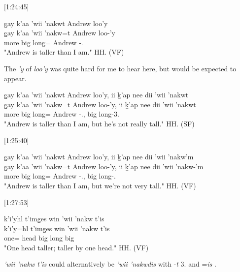 [1:24:45]
\begin{exe}
    \ex \glll
    g̱ay k’aa ’wii ’nakwt Andrew loo'y \\
    g̱ay k’aa ’wii ’nakw=t Andrew loo-'y \\
    \Cntr{} more big long=\Pn{} Andrew \Obl-\Fsg.\Ii \\
    \glt "Andrew is taller than I am." \hfill HH.\ElicitationDate{} (VF)
\end{exe}

The \textit{'y} of \textit{loo'y} was quite hard for me to hear here, but would be expected to appear.

\begin{exe}
    \ex \glll
    g̱ay k’aa ’wii ’nakwt Andrew loo'y, ii ḵ'ap nee dii  ’wii ’nakwt \\
    g̱ay k’aa ’wii ’nakw=t Andrew loo-'y, ii ḵ'ap nee dii  ’wii ’nakwt \\
    \Cntr{} more big long=\Pn{} Andrew \Obl-\Fsg.\Ii, \Ccnj{} \Verum{} \Neg{} \Foc{} big long-3.\Ii \\
    \glt "Andrew is taller than I am, but he's not really tall." \hfill HH.\ElicitationDate{} (SF)
\end{exe}

[1:25:40]
\begin{exe}
    \ex \glll
    g̱ay k’aa ’wii ’nakwt Andrew loo'y, ii ḵ'ap nee dii  ’wii ’nakw'm \\
    g̱ay k’aa ’wii ’nakw=t Andrew loo-'y, ii ḵ'ap nee dii  ’wii ’nakw-'m \\
    \Cntr{} more big long=\Pn{} Andrew \Obl-\Fsg.\Ii, \Ccnj{} \Verum{} \Neg{} \Foc{} big long-\Fpl.\Ii \\
    \glt "Andrew is taller than I am, but we're not very tall." \hfill HH.\ElicitationDate{} (VF)
\end{exe}

[1:27:53]
\begin{exe}
    \ex \glll
    k’i’yhl t’img̱es win ’wii ’nakw t’is \\
    k’i’y=hl t’img̱es win ’wii ’nakw t’is \\
    one=\Cn{} head \Comp{} big long big \\
    \glt "One head taller; taller by one head." \hfill HH.\ElicitationDate{} (VF)
\end{exe}

\textit{’wii ’nakw t’is} could alternatively be \textit{’wii ’nakwdis} with -\textit{t} 3.\Ii{} and =\textit{is} \Qudd. 